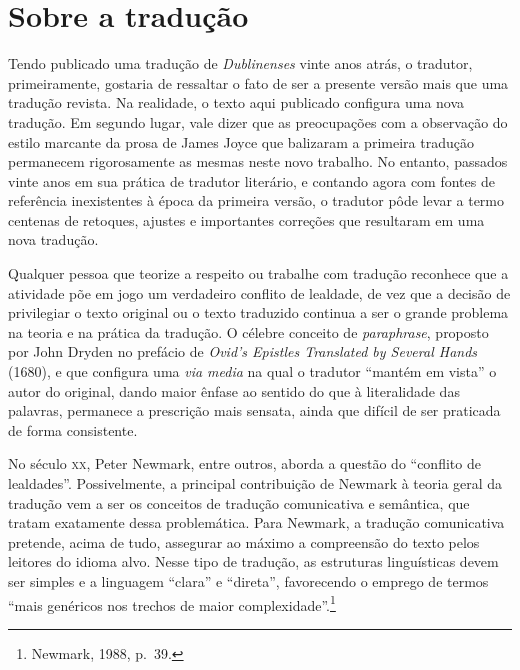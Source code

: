 {\section{Sobre a tradução}

Tendo publicado uma tradução de \textit{Dublinenses} vinte anos atrás, o
tradutor, primeiramente, gostaria de ressaltar o fato de ser a presente versão
mais que uma tradução revista.  Na realidade, o texto aqui publicado configura
uma nova tradução.  Em segundo lugar, vale dizer que as preocupações com a
observação do estilo marcante da prosa de James Joyce que balizaram a primeira
tradução permanecem rigorosamente as mesmas neste novo trabalho.  No entanto,
passados vinte anos em sua prática de tradutor literário, e contando agora com
fontes de referência inexistentes à época da primeira versão, o tradutor pôde
levar a termo centenas de retoques, ajustes e importantes correções que
resultaram em uma nova tradução.

Qualquer pessoa que teorize a respeito ou trabalhe com tradução reconhece que a
atividade põe em jogo um verdadeiro conflito de lealdade, de vez que a decisão
de privilegiar o texto original ou o texto traduzido continua a ser o grande
problema na teoria e na prática da tradução. O célebre conceito de
\textit{paraphrase}, proposto por John Dryden no prefácio de \textit{Ovid’s
Epistles Translated by Several Hands} (1680), e que configura uma \textit{via
media} na qual o tradutor “mantém em vista” o autor do original, dando maior
ênfase ao sentido do que à literalidade das palavras, permanece a prescrição
mais sensata, ainda que difícil de ser praticada de forma consistente.

No século \textsc{xx}, Peter Newmark, entre outros, aborda a questão do
“conflito de lealdades”. Possivelmente, a principal contribuição de Newmark à
teoria geral da tradução vem a ser os conceitos de tradução comunicativa e
semântica, que tratam exatamente dessa problemática. Para Newmark, a tradução
comunicativa pretende, acima de tudo, assegurar ao máximo a compreensão do
texto pelos leitores do idioma alvo. Nesse tipo de tradução, as estruturas
linguísticas devem ser simples e a linguagem “clara” e “direta”, favorecendo o
emprego de termos “mais genéricos nos trechos de maior complexidade”.\footnote{ Newmark,
1988, p.~39.}

}
